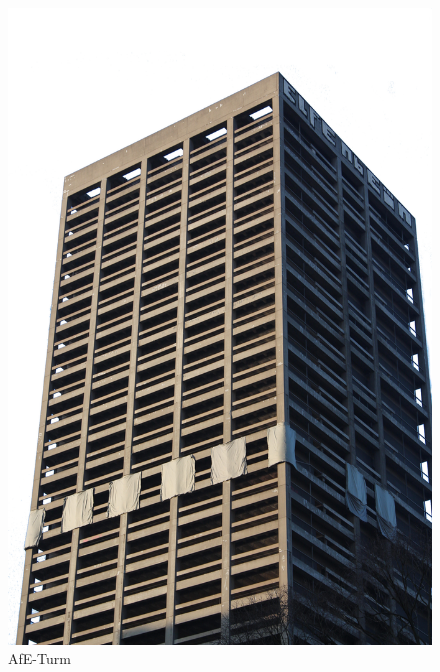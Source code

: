 \begin{figure}[h]
\centering
\includegraphics[width=0.28\textheight]{gfx/afeturm.jpg}
\caption[AfE-Turm]{AfE-Turm}
\label{gr:afeturm}
\end{figure}
\FloatBarrier

